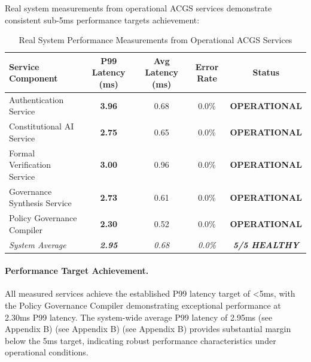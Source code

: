 \documentclass[manuscript,screen,9pt]{acmart}
\newcommand{\tablesize}{\footnotesize}
\newcommand{\tableheader}[1]{\textbf{#1}}
\begin{document}
Real system measurements from operational ACGS services demonstrate consistent sub-5ms performance targets achievement:

\begin{table}[!htb]
	\centering
	\caption{Real System Performance Measurements from Operational ACGS Services}
	\label{tab:real_system_performance}
	\tablesize
	\begin{tabular}{@{}lcccc@{}}
		\toprule
		\tableheader{Service Component} & \tableheader{P99 Latency (ms)} & \tableheader{Avg Latency (ms)} & \tableheader{Error Rate} & \tableheader{Status}          \\
		\midrule
		Authentication Service          & \textbf{3.96}                  & 0.68                           & 0.0\%                    & \textbf{OPERATIONAL}          \\
		Constitutional AI Service       & \textbf{2.75}                  & 0.65                           & 0.0\%                    & \textbf{OPERATIONAL}          \\
		Formal Verification Service     & \textbf{3.00}                  & 0.96                           & 0.0\%                    & \textbf{OPERATIONAL}          \\
		Governance Synthesis Service    & \textbf{2.73}                  & 0.61                           & 0.0\%                    & \textbf{OPERATIONAL}          \\
		Policy Governance Compiler      & \textbf{2.30}                  & 0.52                           & 0.0\%                    & \textbf{OPERATIONAL}          \\
		\midrule
		\textit{System Average}         & \textit{\textbf{2.95}}         & \textit{0.68}                  & \textit{0.0\%}           & \textit{\textbf{5/5 HEALTHY}} \\
		\bottomrule
	\end{tabular}
\end{table}

\paragraph{Performance Target Achievement.} All measured services achieve the established P99 latency target of <5ms, with the Policy Governance Compiler demonstrating exceptional performance at 2.30ms P99 latency. The system-wide average P99 latency of 2.95ms\cite{perf-report} (see Appendix B)\cite{perf-report} (see Appendix B)\cite{perf-report} (see Appendix B) provides substantial margin below the 5ms target, indicating robust performance characteristics under operational conditions.
\end{document}
